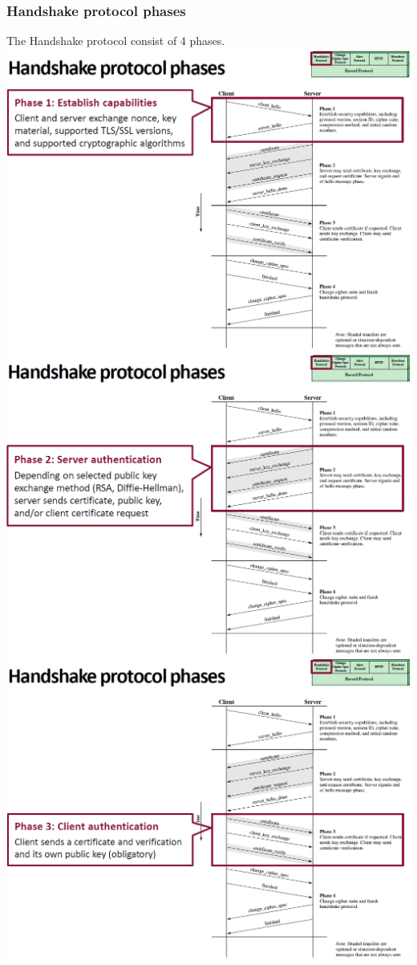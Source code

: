 \documentclass[12pt]{article}
\begin{document}
 \subsubsection{Handshake protocol phases} 
 The Handshake protocol consist of 4 phases.\\
 \includegraphics[width=\linewidth]{./slides/L7P2HSP1.png}\\
 \includegraphics[width=\linewidth]{./slides/L7P2HSP2.png}\\
 \includegraphics[width=\linewidth]{./slides/L7P2HSP3.png}\\
\end{document}
